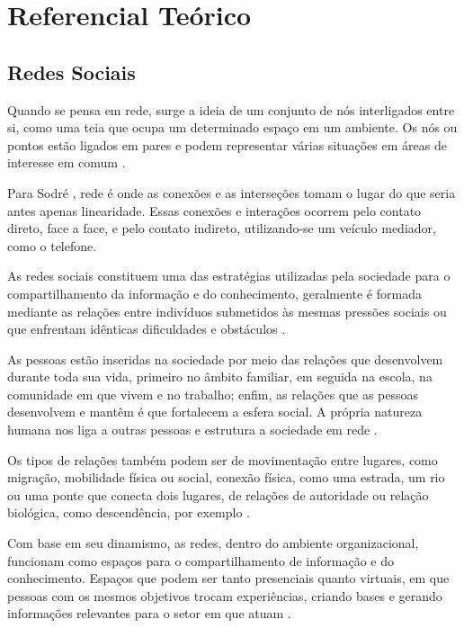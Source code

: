 \chapter{Referencial Teórico}

\section{Redes Sociais}

Quando se pensa em rede, surge a ideia de um conjunto de nós interligados entre si, como uma teia que ocupa um determinado espaço em um ambiente. Os nós ou pontos estão ligados em pares e podem representar várias situações em áreas de interesse em comum \cite{Newman:2010}.

Para Sodré \cite{Sodre:2002}, rede é onde as conexões e as interseções tomam o lugar do que seria antes apenas linearidade. Essas conexões e interações ocorrem pelo contato direto, face a face, e pelo contato indireto, utilizando-se um veículo mediador, como o telefone.

As redes sociais constituem uma das estratégias utilizadas pela sociedade para o compartilhamento da informação e do conhecimento, geralmente é formada mediante as relações entre indivíduos submetidos às mesmas pressões sociais ou que enfrentam idênticas dificuldades e obstáculos \cite{Tomae:Alcara:Chiara:2005}.

As pessoas estão inseridas na sociedade por meio das relações que desenvolvem durante toda sua vida, primeiro no âmbito familiar, em seguida na escola, na comunidade em que vivem e no trabalho; enfim, as relações que as pessoas desenvolvem e mantêm é que fortalecem a esfera social. A própria natureza humana nos liga a outras pessoas e estrutura a sociedade em rede \cite{Tomae:Alcara:Chiara:2005}.

Os tipos de relações também podem ser de movimentação entre lugares, como migração, mobilidade física ou social, conexão física, como uma estrada, um rio ou uma ponte que conecta dois lugares, de relações de autoridade ou relação biológica, como descendência, por exemplo \cite{Wasserman:1994}.

Com base em seu dinamismo, as redes, dentro do ambiente organizacional, funcionam como espaços para o compartilhamento de informação e do conhecimento. Espaços que podem ser tanto presenciais quanto virtuais, em que pessoas com os mesmos objetivos trocam experiências, criando bases e gerando informações relevantes para o setor em que atuam \cite{Tomae:Alcara:Chiara:2005}.

